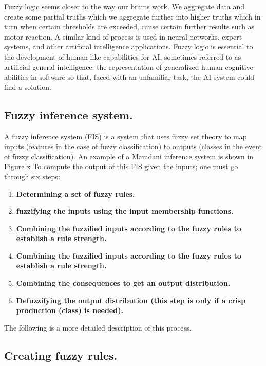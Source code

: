 Fuzzy logic seems closer to the way our brains work. We aggregate data and
create some partial truths which we aggregate further into higher truths which
in turn when certain thresholds are exceeded, cause certain further results such
as motor reaction. A similar kind of process is used in neural networks, expert
systems, and other artificial intelligence applications. Fuzzy logic is
essential to the development of human-like capabilities for AI, sometimes
referred to as artificial general intelligence: the representation of
generalized human cognitive abilities in software so that, faced with an
unfamiliar task, the AI system could find a solution.

\subsection{Fuzzy inference system.} 

A fuzzy inference system (FIS) is a system that uses fuzzy set theory to map
inputs (features in the case of fuzzy classification) to outputs (classes in the
event of fuzzy classification).  An example of a Mamdani inference system is
shown in Figure x To compute the output of this FIS given the inputs; one must
go through six steps:

\begin{enumerate}
\item  \textbf{Determining a set of fuzzy rules.}
\item  \textbf{fuzzifying the inputs using the input membership functions.} 
\item  \textbf{Combining the fuzzified inputs according to the fuzzy rules to establish a rule strength.} 
\item  \textbf{Combining the fuzzified inputs according to the fuzzy rules to establish a rule strength.} 
\item  \textbf{Combining the consequences to get an output distribution.}
\item  \textbf{Defuzzifying the output distribution (this step is only if a crisp production (class) is needed).}
\end{enumerate}

The following is a more detailed description of this process.

\subsection{Creating fuzzy rules.} 

